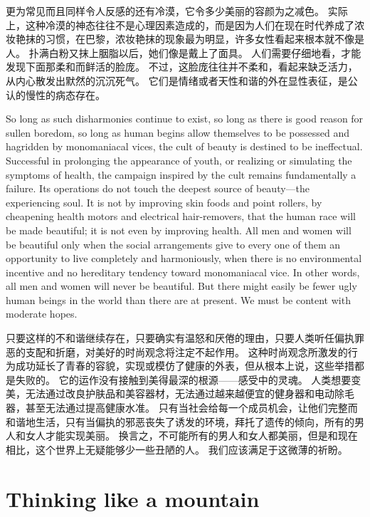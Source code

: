 \documentclass[cs4size, a4paper, 12pt]{article}
\newcounter{numpar}
\newcommand*{\newpar}{\numpar{}}
\begin{document}
	更为常见而且同样令人反感的还有冷漠，它令多少美丽的容颜为之减色。 实际上，这种冷漠的神态往往不是心理因素造成的，而是因为人们在现在时代养成了浓妆艳抹的习惯，在巴黎，浓妆艳抹的现象最为明显，许多女性看起来根本就不像是人。 扑满白粉又抹上胭脂以后，她们像是戴上了面具。 人们需要仔细地看，才能发现下面那柔和而鲜活的脸庞。 不过，这脸庞往往并不柔和，看起来缺乏活力，从内心散发出默然的沉沉死气。 它们是情绪或者天性和谐的外在显性表征，是公认的慢性的病态存在。 
	
	\newpar So long as such disharmonies continue to exist, so long as there is good reason for sullen boredom, so long as human begins allow themselves to be possessed and hagridden by monomaniacal vices, the cult of beauty is destined to be ineffectual. Successful in prolonging the appearance of youth, or realizing or simulating the symptoms of health, the campaign inspired by the cult remains fundamentally a failure. Its operations do not touch the deepest source of beauty—the experiencing soul. It is not by improving skin foods and point rollers, by cheapening health motors and electrical hair-removers, that the human race will be made beautiful; it is not even by improving health. All men and women will be beautiful only when the social arrangements give to every one of them an opportunity to live completely and harmoniously, when there is no environmental incentive and no hereditary tendency toward monomaniacal vice. In other words, all men and women will never be beautiful. But there might easily be fewer ugly human beings in the world than there are at present. We must be content with moderate hopes.
	
	只要这样的不和谐继续存在，只要确实有温怒和厌倦的理由，只要人类听任偏执罪恶的支配和折磨，对美好的时尚观念将注定不起作用。 这种时尚观念所激发的行为成功延长了青春的容貌，实现或模仿了健康的外表，但从根本上说，这些举措都是失败的。 它的运作没有接触到美得最深的根源——感受中的灵魂。 人类想要变美，无法通过改良护肤品和美容器材，无法通过越来越便宜的健身器和电动除毛器，甚至无法通过提高健康水准。 只有当社会给每一个成员机会，让他们完整而和谐地生活，只有当偏执的邪恶丧失了诱发的环境，拜托了遗传的倾向，所有的男人和女人才能实现美丽。 换言之，不可能所有的男人和女人都美丽，但是和现在相比，这个世界上无疑能够少一些丑陋的人。 我们应该满足于这微薄的祈盼。 
	
	\section{ Thinking like a mountain}
	\setcounter{numpar}{0}
	
\end{document}
